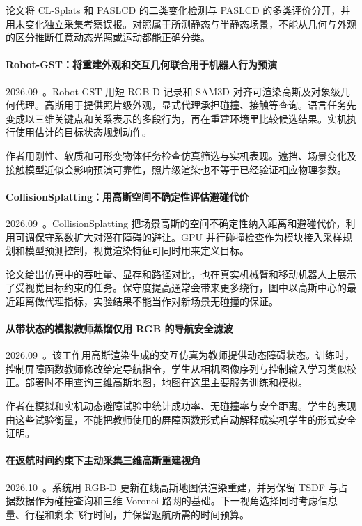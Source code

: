 论文将 CL-Splats 和 PASLCD 的二类变化检测与 PASLCD 的多类评价分开，并用未变化独立采集考察误报。对照属于所测静态与半静态场景，不能从几何与外观的区分推断任意动态光照或运动都能正确分类。

\paragraph{Robot-GST：将重建外观和交互几何联合用于机器人行为预演}
2026.09~\cite{2609_33872}。Robot-GST 用短 RGB-D 记录和 SAM3D 对齐可渲染高斯及对象级几何代理。高斯用于提供照片级外观，显式代理承担碰撞、接触等查询。语言任务先变成以三维关键点和关系表示的多段行为，再在重建环境里比较候选结果。实机执行使用估计的目标状态规划动作。

作者用刚性、软质和可形变物体任务检查仿真筛选与实机表现。遮挡、场景变化及接触模型近似会影响预演可靠性，照片级渲染也不等于已经验证相应物理参数。

\paragraph{CollisionSplatting：用高斯空间不确定性评估避碰代价}
2026.09~\cite{2609_35619}。CollisionSplatting 把场景高斯的空间不确定性纳入距离和避碰代价，利用可调保守系数扩大对潜在障碍的避让。GPU 并行碰撞检查作为模块接入采样规划和模型预测控制，视觉渲染特征可同时用来定义目标。

论文给出仿真中的吞吐量、显存和路径对比，也在真实机械臂和移动机器人上展示了受视觉目标约束的任务。保守度提高通常会带来更多绕行，图中以高斯中心的最近距离做代理指标，实验结果不能当作对新场景无碰撞的保证。

\paragraph{从带状态的模拟教师蒸馏仅用 RGB 的导航安全滤波}
2026.09~\cite{2609_36520}。该工作用高斯渲染生成的交互仿真为教师提供动态障碍状态。训练时，控制屏障函数教师修改给定导航指令，学生从相机图像序列与控制输入学习类似校正。部署时不用查询三维高斯地图，地图在这里主要服务训练和模拟。

作者在模拟和实机动态避障试验中统计成功率、无碰撞率与安全距离。学生的表现由这些试验衡量，不能把教师使用的屏障函数形式自动解释成实机学生的形式安全证明。

\paragraph{在返航时间约束下主动采集三维高斯重建视角}
2026.10~\cite{2610_04013}。系统用 RGB-D 更新在线高斯地图供渲染重建，并另保留 TSDF 与占据数据作为碰撞查询和三维 Voronoi 路网的基础。下一视角选择同时考虑信息量、行程和剩余飞行时间，并保留返航所需的时间预算。


